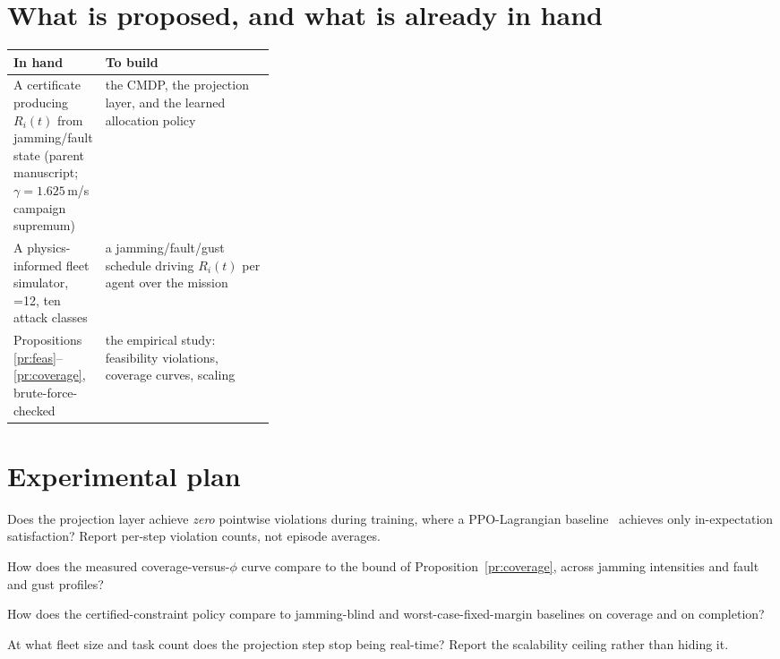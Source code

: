 \documentclass[11pt,a4paper]{article}
\newcommand{\Ri}{R_i}
\begin{document}
\section{What is proposed, and what is already in hand}
\begin{center}\small
\begin{tabularx}{\linewidth}{@{}P{0.34\linewidth}Y@{}}
\toprule
\textbf{In hand} & \textbf{To build} \\
\midrule
A certificate producing $\Ri(t)$ from jamming/fault state (parent manuscript;
$\gamma=1.625$\,m/s campaign supremum) &
the CMDP, the projection layer, and the learned allocation policy \\
A physics-informed fleet simulator, =12, ten attack classes &
a jamming/fault/gust schedule driving $\Ri(t)$ per agent over the mission \\
Propositions \ref{pr:feas}--\ref{pr:coverage}, brute-force-checked &
the empirical study: feasibility violations, coverage curves, scaling \\
\bottomrule
\end{tabularx}
\end{center}

\section{Experimental plan}
\begin{description}[leftmargin=2.6em,style=nextline]
\item[RQ1] Does the projection layer achieve \emph{zero} pointwise violations
  during training, where a PPO-Lagrangian baseline~\cite{yu2022mappo,achiam2017cpo}
  achieves only in-expectation satisfaction? Report per-step violation counts,
  not episode averages.
\item[RQ2] How does the measured coverage-versus-$\phi$ curve compare to the
  bound of Proposition~\ref{pr:coverage}, across jamming intensities and fault
  and gust profiles?
\item[RQ3] How does the certified-constraint policy compare to
  jamming-blind and worst-case-fixed-margin baselines on coverage and on
  completion?
\item[RQ4] At what fleet size and task count does the projection step stop being
  real-time? Report the scalability ceiling rather than hiding it.
\end{description}
\end{document}
